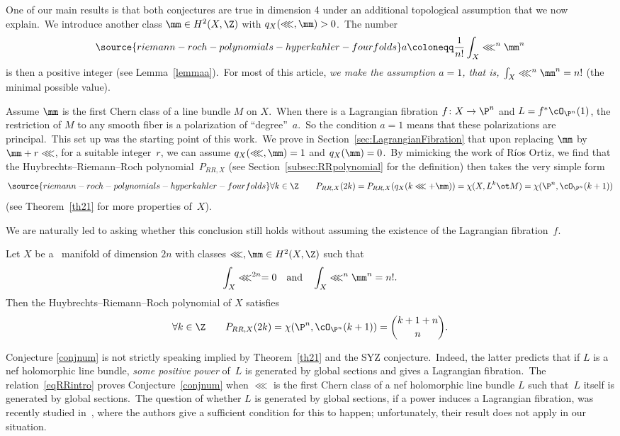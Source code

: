 One of our main results is that both conjectures are true in dimension 4 under an additional topological assumption that we now explain.\ We introduce another class $\mm\in H^2(X,\Z)$ with $q_X(\lll,\mm)>0$.\
The number
\begin{equation}\label{defaintro}
\source{riemann-roch-polynomials-hyperkahler-fourfolds}
    a\coloneqq\frac{1}{n!}\int_X\lll^n\mm^n
\end{equation}
is then a positive integer (see Lemma~\ref{lemmaa}).\
For most of this article, {\em we make the assumption $a=1$, that is, $\int_X\lll^n\mm^n=n!$} (the minimal possible value).

Assume  $\mm$ is the first Chern class of  a line bundle $M$ on $X$.\
When there is a Lagrangian fibration $f\colon X\to \P^n$ and $L=f^*\cO_{\P^n}(1)$, the restriction of $M$ to any smooth fiber is  a polarization of ``degree''~$a$.\
So the condition $a=1$ means that these  polarizations are  principal.\
This set up was the starting point of this work.\
We prove in Section~\ref{sec:LagrangianFibration}  that upon replacing $\mm$ by $\mm+r\lll$, for a suitable integer~$r$,  we can assume $q_X(\lll,\mm)=1$ and $q_X(\mm)=0$.\
By mimicking the work \cite{ort} of R\'ios Ortiz, we find that the  Huybrechts--Riemann--Roch polynomial~$P_{RR,X}$ (see  Section~\ref{subsec:RRpolynomial} for the definition) then takes the very simple form
\begin{equation}\label{eqRRintro}
\forall k\in\Z\qquad P_{RR,X}(2k)=P_{RR,X}(q_X(k\lll+\mm))=\chi(X,L^k\ot M)=\chi(\P^n,\cO_{\P^n}(k+1))
\end{equation}
(see Theorem~\ref{th21} for more properties of~$X$).

We are naturally led to asking whether this conclusion still holds without assuming the existence of the Lagrangian fibration~$f$.

\begin{conj}
\source{riemann-roch-polynomials-hyperkahler-fourfolds}
\notready\label{conjnum}
Let $X$ be a \hk\ manifold of dimension $2n$ with  classes $\lll,\mm\in H^2(X,\Z)$ such that
\[
\int_X\lll^{2n}=0\quad\textnormal{and}\quad\int_X\lll^n\mm^n=n!.
\]
Then the Huybrechts--Riemann--Roch polynomial of $X$  satisfies
$$\forall k\in\Z\qquad P_{RR,X}(2k)=\chi(\P^n,\cO_{\P^n}(k+1))=\binom{k+1+n}{n}.$$
\end{conj}

Conjecture \ref{conjnum} is not strictly speaking implied by Theorem~\ref{th21} and the SYZ conjecture.\ Indeed, the latter predicts that if $L$ is a nef holomorphic line bundle, {\it some positive power} of~$L$ is generated by global sections and gives a Lagrangian fibration.\
The relation~\eqref{eqRRintro} proves Conjecture~\ref{conjnum}  when $\lll$ is the first Chern class of a nef holomorphic line bundle $L$ such that~$L$ itself is generated by global sections.\
The question of whether $L$ is generated by global sections, if a power induces a Lagrangian fibration, was recently studied  in~\cite{kv}, where the authors give  a sufficient condition for this to happen; unfortunately, their result does not apply in our situation.

